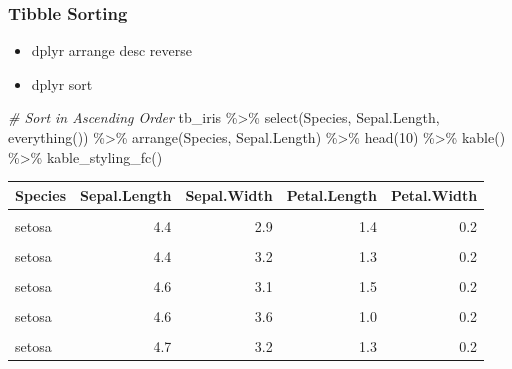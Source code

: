 \documentclass[
]{book}
\newenvironment{Shaded}{\begin{snugshade}}{\end{snugshade}}
\newcommand{\CommentTok}[1]{\textcolor[rgb]{0.56,0.35,0.01}{\textit{#1}}}
\newcommand{\DecValTok}[1]{\textcolor[rgb]{0.00,0.00,0.81}{#1}}
\newcommand{\FunctionTok}[1]{\textcolor[rgb]{0.00,0.00,0.00}{#1}}
\newcommand{\NormalTok}[1]{#1}
\newcommand{\SpecialCharTok}[1]{\textcolor[rgb]{0.00,0.00,0.00}{#1}}
\providecommand{\tightlist}{%
  \setlength{\itemsep}{0pt}\setlength{\parskip}{0pt}}
\begin{document}
\hypertarget{tibble-sorting}{%
\subsubsection{Tibble Sorting}\label{tibble-sorting}}

\begin{itemize}
\tightlist
\item
  dplyr arrange desc reverse
\item
  dplyr sort
\end{itemize}

\begin{Shaded}
\begin{Highlighting}[]
\CommentTok{\# Sort in Ascending Order}
\NormalTok{tb\_iris }\SpecialCharTok{\%\textgreater{}\%} \FunctionTok{select}\NormalTok{(Species, Sepal.Length, }\FunctionTok{everything}\NormalTok{()) }\SpecialCharTok{\%\textgreater{}\%}
  \FunctionTok{arrange}\NormalTok{(Species, Sepal.Length) }\SpecialCharTok{\%\textgreater{}\%} \FunctionTok{head}\NormalTok{(}\DecValTok{10}\NormalTok{) }\SpecialCharTok{\%\textgreater{}\%}
  \FunctionTok{kable}\NormalTok{() }\SpecialCharTok{\%\textgreater{}\%} \FunctionTok{kable\_styling\_fc}\NormalTok{()}
\end{Highlighting}
\end{Shaded}

\begin{table}[!h]
\centering
\begin{tabular}{l|r|r|r|r}
\hline
Species & Sepal.Length & Sepal.Width & Petal.Length & Petal.Width\\
\hline
\cellcolor{gray!6}{setosa} & \cellcolor{gray!6}{4.3} & \cellcolor{gray!6}{3.0} & \cellcolor{gray!6}{1.1} & \cellcolor{gray!6}{0.1}\\
\hline
setosa & 4.4 & 2.9 & 1.4 & 0.2\\
\hline
\cellcolor{gray!6}{setosa} & \cellcolor{gray!6}{4.4} & \cellcolor{gray!6}{3.0} & \cellcolor{gray!6}{1.3} & \cellcolor{gray!6}{0.2}\\
\hline
setosa & 4.4 & 3.2 & 1.3 & 0.2\\
\hline
\cellcolor{gray!6}{setosa} & \cellcolor{gray!6}{4.5} & \cellcolor{gray!6}{2.3} & \cellcolor{gray!6}{1.3} & \cellcolor{gray!6}{0.3}\\
\hline
setosa & 4.6 & 3.1 & 1.5 & 0.2\\
\hline
\cellcolor{gray!6}{setosa} & \cellcolor{gray!6}{4.6} & \cellcolor{gray!6}{3.4} & \cellcolor{gray!6}{1.4} & \cellcolor{gray!6}{0.3}\\
\hline
setosa & 4.6 & 3.6 & 1.0 & 0.2\\
\hline
\cellcolor{gray!6}{setosa} & \cellcolor{gray!6}{4.6} & \cellcolor{gray!6}{3.2} & \cellcolor{gray!6}{1.4} & \cellcolor{gray!6}{0.2}\\
\hline
setosa & 4.7 & 3.2 & 1.3 & 0.2\\
\hline
\end{tabular}
\end{table}
\end{document}
